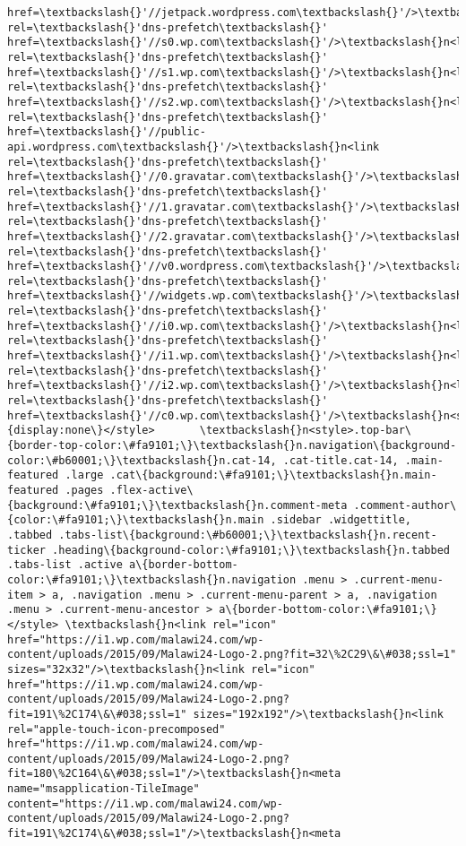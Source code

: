 \documentclass[11pt]{article}
\begin{document}
\begin{Verbatim}[commandchars=\\\{\}]
href=\textbackslash{}'//jetpack.wordpress.com\textbackslash{}'/>\textbackslash{}n<link rel=\textbackslash{}'dns-prefetch\textbackslash{}' href=\textbackslash{}'//s0.wp.com\textbackslash{}'/>\textbackslash{}n<link rel=\textbackslash{}'dns-prefetch\textbackslash{}' href=\textbackslash{}'//s1.wp.com\textbackslash{}'/>\textbackslash{}n<link rel=\textbackslash{}'dns-prefetch\textbackslash{}' href=\textbackslash{}'//s2.wp.com\textbackslash{}'/>\textbackslash{}n<link rel=\textbackslash{}'dns-prefetch\textbackslash{}' href=\textbackslash{}'//public-api.wordpress.com\textbackslash{}'/>\textbackslash{}n<link rel=\textbackslash{}'dns-prefetch\textbackslash{}' href=\textbackslash{}'//0.gravatar.com\textbackslash{}'/>\textbackslash{}n<link rel=\textbackslash{}'dns-prefetch\textbackslash{}' href=\textbackslash{}'//1.gravatar.com\textbackslash{}'/>\textbackslash{}n<link rel=\textbackslash{}'dns-prefetch\textbackslash{}' href=\textbackslash{}'//2.gravatar.com\textbackslash{}'/>\textbackslash{}n<link rel=\textbackslash{}'dns-prefetch\textbackslash{}' href=\textbackslash{}'//v0.wordpress.com\textbackslash{}'/>\textbackslash{}n<link rel=\textbackslash{}'dns-prefetch\textbackslash{}' href=\textbackslash{}'//widgets.wp.com\textbackslash{}'/>\textbackslash{}n<link rel=\textbackslash{}'dns-prefetch\textbackslash{}' href=\textbackslash{}'//i0.wp.com\textbackslash{}'/>\textbackslash{}n<link rel=\textbackslash{}'dns-prefetch\textbackslash{}' href=\textbackslash{}'//i1.wp.com\textbackslash{}'/>\textbackslash{}n<link rel=\textbackslash{}'dns-prefetch\textbackslash{}' href=\textbackslash{}'//i2.wp.com\textbackslash{}'/>\textbackslash{}n<link rel=\textbackslash{}'dns-prefetch\textbackslash{}' href=\textbackslash{}'//c0.wp.com\textbackslash{}'/>\textbackslash{}n<style>img\#wpstats\{display:none\}</style>       \textbackslash{}n<style>.top-bar\{border-top-color:\#fa9101;\}\textbackslash{}n.navigation\{background-color:\#b60001;\}\textbackslash{}n.cat-14, .cat-title.cat-14, .main-featured .large .cat\{background:\#fa9101;\}\textbackslash{}n.main-featured .pages .flex-active\{background:\#fa9101;\}\textbackslash{}n.comment-meta .comment-author\{color:\#fa9101;\}\textbackslash{}n.main .sidebar .widgettitle, .tabbed .tabs-list\{background:\#b60001;\}\textbackslash{}n.recent-ticker .heading\{background-color:\#fa9101;\}\textbackslash{}n.tabbed .tabs-list .active a\{border-bottom-color:\#fa9101;\}\textbackslash{}n.navigation .menu > .current-menu-item > a, .navigation .menu > .current-menu-parent > a, .navigation .menu > .current-menu-ancestor > a\{border-bottom-color:\#fa9101;\}</style> \textbackslash{}n<link rel="icon" href="https://i1.wp.com/malawi24.com/wp-content/uploads/2015/09/Malawi24-Logo-2.png?fit=32\%2C29\&\#038;ssl=1" sizes="32x32"/>\textbackslash{}n<link rel="icon" href="https://i1.wp.com/malawi24.com/wp-content/uploads/2015/09/Malawi24-Logo-2.png?fit=191\%2C174\&\#038;ssl=1" sizes="192x192"/>\textbackslash{}n<link rel="apple-touch-icon-precomposed" href="https://i1.wp.com/malawi24.com/wp-content/uploads/2015/09/Malawi24-Logo-2.png?fit=180\%2C164\&\#038;ssl=1"/>\textbackslash{}n<meta name="msapplication-TileImage" content="https://i1.wp.com/malawi24.com/wp-content/uploads/2015/09/Malawi24-Logo-2.png?fit=191\%2C174\&\#038;ssl=1"/>\textbackslash{}n<meta 
\end{Verbatim}
\end{document}
